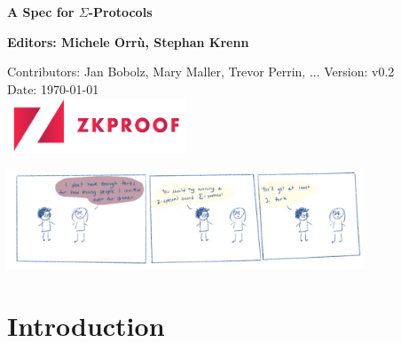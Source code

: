 \documentclass[11pt]{article}
\begin{document}
%
%



\begin{titlepage}
   \begin{center}
       \vspace*{1cm}
       \textbf{\Huge{A Spec for $\Sigma$-Protocols}}

       \vspace{2.0cm}
       \textbf{Editors: Michele Orrù, Stephan Krenn}

       \vspace{1.0cm}
			 Contributors: Jan Bobolz, Mary Maller, Trevor Perrin, ...
       \vfill
       Version: v0.2\\
       \vspace{0.5cm}
       Date: \today\\
       \vspace{1.3cm}
       \includegraphics[width=0.4\textwidth]{zkproof.png}
   \end{center}
\end{titlepage}


{
  \hypersetup{hidelinks}
  \tableofcontents
}
\vfill
\begin{center}
  \includegraphics[width=0.8\textwidth]{Dinner_Party.png}
\end{center}

\clearpage
{}
\setcounter{page}{1}








\section{Introduction}
\end{document}
